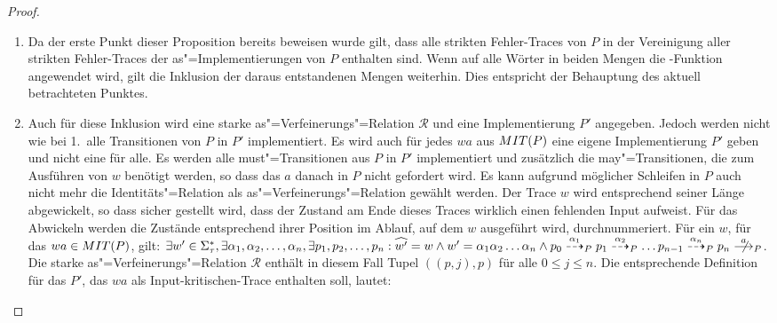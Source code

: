 \begin{proof}
\begin{enumerate}
    \item Da der erste Punkt dieser Proposition bereits beweisen wurde gilt,
      dass alle strikten Fehler-Traces von $P$ in der Vereinigung aller
      strikten Fehler-Traces der as"=Implementierungen von $P$ enthalten sind.
      Wenn auf alle Wörter in beiden Mengen die \prune{}-Funktion angewendet
      wird, gilt die Inklusion der daraus entstandenen Mengen weiterhin. Dies
      entspricht der Behauptung des aktuell betrachteten Punktes.
    \item Auch für diese Inklusion wird eine starke as"=Verfeinerungs"=Relation
      $\mathcal{R}$ und eine Implementierung $P'$ angegeben. Jedoch werden
      nicht wie bei 1.\ alle Transitionen von $P$ in $P'$ implementiert. Es
      wird auch für jedes $wa$ aus $MIT (P)$ eine eigene Implementierung $P'$
      geben und nicht eine für alle. Es werden alle must"=Transitionen aus $P$
      in $P'$ implementiert und zusätzlich die may"=Transitionen, die zum
      Ausführen von $w$ benötigt werden, so dass das $a$ danach in $P$ nicht
      gefordert wird. Es kann aufgrund möglicher Schleifen in $P$ auch nicht
      mehr die Identitäts"=Relation als as"=Verfeinerungs"=Relation gewählt
      werden. Der Trace $w$ wird entsprechend seiner Länge abgewickelt, so dass
      sicher gestellt wird, dass der Zustand am Ende dieses Traces wirklich
      einen fehlenden Input aufweist. Für das Abwickeln werden die Zustände
      entsprechend ihrer Position im Ablauf, auf dem $w$ ausgeführt wird,
      durchnummeriert. Für ein $w$, für das $wa\in MIT (P)$, gilt: $\exists
      w'\in\Sigma _{\tau} ^*, \exists \alpha _1,\alpha _2,\dots ,\alpha _n,
      \exists p_1,p_2,\dots ,p_n: \widehat{w'} = w\land w'=\alpha _1\alpha
      _2\dots \alpha _n\land p_0 \may[\alpha _1]_P p_1 \may[\alpha _2]_P \dots
      p_{n-1}\may[\alpha _n]_P p_n \nmust[a]_P$.
      Die starke as"=Verfeinerungs"=Relation $\mathcal{R}$ enthält in diesem
      Fall Tupel $((p,j),p)$ für alle $0\leq j \leq n$. Die entsprechende
      Definition für das $P'$, das $wa$ als Input-kritischen-Trace enthalten
      soll, lautet:
\end{enumerate}
\end{proof}
